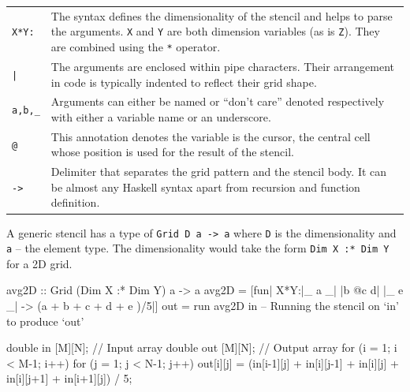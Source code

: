 \documentclass[12pt,a4paper,twoside]{scrbook}
\begin{document}
\begin{tabular}{p{} p{}}

\texttt{X*Y:} & The syntax defines the dimensionality of the stencil and helps
to parse the arguments. \texttt{X} and \texttt{Y} are both dimension variables
(as is \texttt{Z}). They are combined using the \texttt{*} operator.  \\

\texttt{|} & The arguments are enclosed within pipe characters.  Their
arrangement in code is typically indented to reflect their grid shape.  \\

\texttt{a,b,\_} & Arguments can either be named or ``don't care'' denoted
respectively with either a variable name or an underscore.  \\

\texttt{@} & This annotation denotes the variable is the cursor, the central
cell whose position is used for the result of the stencil.  \\

\texttt{->} & Delimiter that separates the grid pattern and the stencil body. It
can be almost any Haskell syntax apart from recursion and function definition.
\\

\end{tabular}

A generic stencil has a type of \texttt{Grid D a -> a} where \texttt{D} is the
dimensionality and \texttt{a} -- the element type. The dimensionality would take
the form \texttt{Dim X :* Dim Y} for a 2D grid.

\begin{hflisting}[label={lst:ypsyn},caption={A simple mean function. Computes
    the mean of the neighbourhood of cells.}]
avg2D :: Grid (Dim X :* Dim Y) a -> a
avg2D = [fun| X*Y:|_  a _|
                  |b @c d|
                  |_  e _| -> (a + b + c + d + e )/5|]
out = run avg2D in -- Running the stencil on `in' to produce `out'

\end{hflisting}

\begin{hflisting}[label=lst:avgimp, caption={An imperative implementation of the
    average function.}]
double in [M][N]; // Input array
double out [M][N]; // Output array
for (i = 1; i < M-1; i++){
  for (j = 1; j < N-1; j++){
    out[i][j] =  (in[i-1][j] +
     in[i][j-1] + in[i][j] + in[i][j+1]
                + in[i+1][j]) / 5;
  }
}
\end{hflisting}
\end{document}
